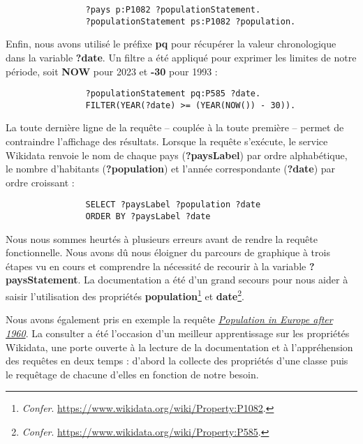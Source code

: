 \documentclass[hidelinks, 12pt]{article}
\begin{document}
			\begin{verbatim}
				?pays p:P1082 ?populationStatement.
				?populationStatement ps:P1082 ?population.
			\end{verbatim}
		
			Enfin, nous avons utilisé le préfixe \textbf{pq} pour récupérer la valeur chronologique dans la variable \textbf{?date}. Un filtre a été appliqué pour exprimer les limites de notre période, soit \textbf{NOW} pour 2023 et \textbf{-30} pour 1993 :
			
			\begin{verbatim}
				?populationStatement pq:P585 ?date.
				FILTER(YEAR(?date) >= (YEAR(NOW()) - 30)).
			\end{verbatim}
			
			La toute dernière ligne de la requête -- couplée à la toute première -- permet de contraindre l'affichage des résultats. Lorsque la requête s'exécute, le service Wikidata renvoie le nom de chaque pays (\textbf{?paysLabel}) par ordre alphabétique, le nombre d'habitants (\textbf{?population}) et l'année correspondante (\textbf{?date}) par ordre croissant :
			
			\begin{verbatim}
				SELECT ?paysLabel ?population ?date
				ORDER BY ?paysLabel ?date
			\end{verbatim}
		
			Nous nous sommes heurtés à plusieurs erreurs avant de rendre la requête fonctionnelle. Nous avons dû nous éloigner du parcours de graphique à trois étapes vu en cours et comprendre la nécessité de recourir à la variable \textbf{?paysStatement}. La documentation a été d'un grand secours pour nous aider à saisir l'utilisation des propriétés \textbf{population}\footnote{\emph{Confer}. \url{https://www.wikidata.org/wiki/Property:P1082}.} et \textbf{date}\footnote{\emph{Confer}. \url{https://www.wikidata.org/wiki/Property:P585}.}.
			
			Nous avons également pris en exemple la requête \href{https://query.wikidata.org/#%23Population%20in%20Europe%20after%201960%0ASELECT%20%20%3FobjectLabel%20%20%20%20%28YEAR%28%3Fdate%29%20as%20%3Fyear%29%0A%20%20%20%20%20%20%20%20%3Fpopulation%20%20%20%20%20%28%3FobjectLabel%20as%20%3FLocation%29%0AWHERE%0A%7B%0A%20%20%20%20%20%20%20%20wd%3AQ458%20wdt%3AP150%20%3Fobject%20.%20%20%20%23%20European%20Union%20%20contains%20administrative%20territorial%20entity%0A%20%20%20%20%20%20%20%20%3Fobject%20p%3AP1082%20%3FpopulationStatement%20.%0A%20%20%20%20%20%20%20%20%3FpopulationStatement%20%20%20%20ps%3AP1082%20%3Fpopulation%0A%20%20%20%20%20%20%20%20%3B%20pq%3AP585%20%3Fdate%20.%0A%20%20%20%20%20%20%20%20SERVICE%20wikibase%3Alabel%20%7B%20bd%3AserviceParam%20wikibase%3Alanguage%20%22%5BAUTO_LANGUAGE%5D%2Cen%22%20%7D%20%20%20%20%20%20%20%20%20%20%20%20%20%20%20%0A%20%20FILTER%20%28YEAR%28%3Fdate%29%20%3E%3D%201960%29%0A%7D%0AORDER%20BY%20%3FobjectLabel%20%3Fyear}{\emph{Population in Europe after 1960}}. La consulter a été l'occasion d'un meilleur apprentissage sur les propriétés Wikidata, une porte ouverte à la lecture de la documentation et à l'appréhension des requêtes en deux temps : d'abord la collecte des propriétés d'une classe puis le requêtage de chacune d'elles en fonction de notre besoin.
\end{document}
